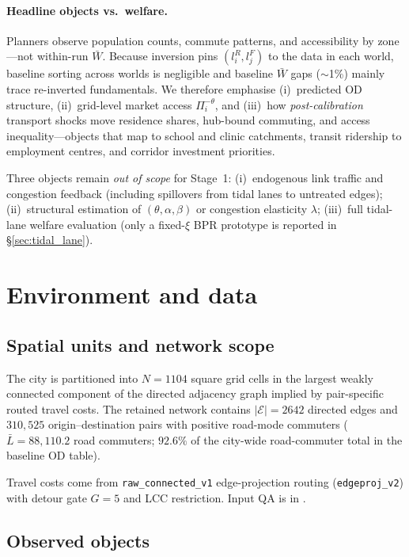 \documentclass[12pt]{article}
\newcommand{\E}{\mathcal E}
\newcommand{\Lbar}{\bar L}
\newcommand{\Wbar}{\bar W}
\begin{document}
\paragraph{Headline objects vs.\ welfare.}
Planners observe population counts, commute patterns, and accessibility by zone---not
within-run $\Wbar$.
Because inversion pins $(l_i^R,l_j^F)$ to the data in each world, baseline sorting
across worlds is negligible and baseline $\Wbar$ gaps ($\sim$1\%) mainly trace
re-inverted fundamentals.
We therefore emphasise (i)~predicted OD structure, (ii)~grid-level market access
$\Pi_i^{-\theta}$, and (iii)~how \emph{post-calibration} transport shocks move
residence shares, hub-bound commuting, and access inequality---objects that map to
school and clinic catchments, transit ridership to employment centres, and corridor
investment priorities.

Three objects remain \emph{out of scope} for Stage~1:
(i)~endogenous link traffic and congestion feedback (including spillovers from tidal lanes
to untreated edges);
(ii)~structural estimation of $(\theta,\alpha,\beta)$ or congestion elasticity $\lambda$;
(iii)~full tidal-lane welfare evaluation (only a fixed-$\xi$ BPR prototype is reported in
\S\ref{sec:tidal_lane}).

\section{Environment and data}\label{sec:data}

\subsection{Spatial units and network scope}

The city is partitioned into $N=1104$ square grid cells in the largest weakly connected
component of the directed adjacency graph implied by pair-specific routed travel costs.
The retained network contains $|\E|=2642$ directed edges and $310{,}525$ origin--destination
pairs with positive road-mode commuters ($\Lbar=88{,}110.2$ road commuters; $92.6\%$ of the
city-wide road-commuter total in the baseline OD table).

Travel costs come from \texttt{raw\_connected\_v1} edge-projection routing
(\texttt{edgeproj\_v2}) with detour gate $G=5$ and LCC restriction.
Input QA is in .

\subsection{Observed objects}
\end{document}
